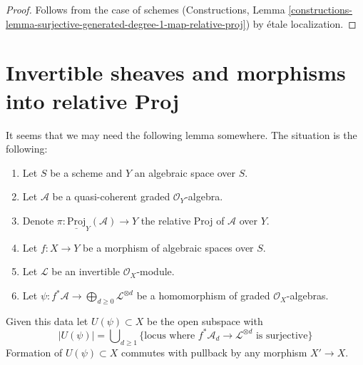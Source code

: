\begin{proof}
Follows from the case of schemes
(Constructions, Lemma
\ref{constructions-lemma-surjective-generated-degree-1-map-relative-proj})
by \'etale localization.
\end{proof}










\section{Invertible sheaves and morphisms into relative Proj}
\label{section-invertible-relative-proj}

\noindent
It seems that we may need the following lemma somewhere.
The situation is the following:
\begin{enumerate}
\item Let $S$ be a scheme and $Y$ an algebraic space over $S$.
\item Let $\mathcal{A}$ be a quasi-coherent graded $\mathcal{O}_Y$-algebra.
\item Denote $\pi : \underline{\text{Proj}}_Y(\mathcal{A}) \to Y$ the relative
Proj of $\mathcal{A}$ over $Y$.
\item Let $f : X \to Y$ be a morphism of algebraic spaces over $S$.
\item Let $\mathcal{L}$ be an invertible $\mathcal{O}_X$-module.
\item Let
$\psi : f^*\mathcal{A} \to \bigoplus_{d \geq 0} \mathcal{L}^{\otimes d}$
be a homomorphism of graded $\mathcal{O}_X$-algebras.
\end{enumerate}
Given this data let $U(\psi) \subset X$ be the open subspace with
$$
|U(\psi)| = \bigcup\nolimits_{d \geq 1}
\{\text{locus where }f^*\mathcal{A}_d \to \mathcal{L}^{\otimes d}
\text{ is surjective}\}
$$
Formation of $U(\psi) \subset X$ commutes with
pullback by any morphism $X' \to X$.


